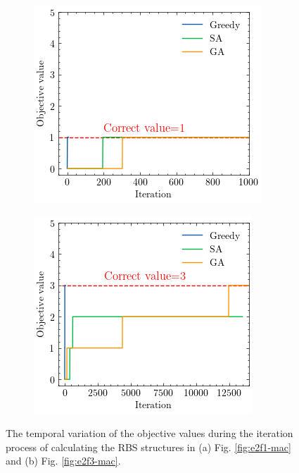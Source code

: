 \documentclass{article}
\begin{document}
\begin{figure}[htbp]
    \centering
    \begin{subfigure}[b]{0.34\textwidth}
        \includegraphics[width=\textwidth]{e2f1-alg.png}
        \caption{}
        \label{fig:e2f1-alg}
    \end{subfigure}
    \hspace{0.02\textwidth}
    \begin{subfigure}[b]{0.33\textwidth}
        \includegraphics[width=\textwidth]{e2f3-alg.png}
        \caption{}
        \label{fig:e2f3-alg}
    \end{subfigure}
    \caption{The temporal variation of the objective values during the iteration process of calculating the RBS structures in (a) Fig. \ref{fig:e2f1-mac} and (b) Fig. \ref{fig:e2f3-mac}.}
\end{figure}
\end{document}

